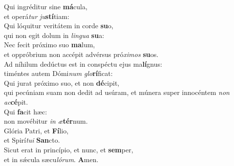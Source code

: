\evenverse Qui ingréditur sine \textbf{má}cula,~\*\\
\evenverse et operá\textit{tur} \textit{ju}\textbf{stí}tiam:\\
\oddverse Qui lóquitur veritátem in corde \textbf{su}o,~\*\\
\oddverse qui non egit dolum in \textit{lin}\textit{gua} \textbf{su}a:\\
\evenverse Nec fecit próximo suo \textbf{ma}lum,~\*\\
\evenverse et oppróbrium non accépit advérsus pró\textit{xi}\textit{mos} \textbf{su}os.\\
\oddverse Ad níhilum dedúctus est in conspéctu ejus ma\textbf{lí}gnus:~\*\\
\oddverse timéntes autem Dómi\textit{num} \textit{glo}\textbf{rí}ficat:\\
\evenverse Qui jurat próximo suo, et non \textbf{dé}cipit,~\*\\
\evenverse qui pecúniam suam non dedit ad usúram, et múnera super innocéntem \textit{non} \textit{ac}\textbf{cé}pit.\\
\oddverse Qui \textbf{fa}cit hæc:~\*\\
\oddverse non movébitur \textit{in} \textit{æ}\textbf{tér}num.\\
\evenverse Glória Patri, et \textbf{Fí}lio,~\*\\
\evenverse et Spirí\textit{tu}\textit{i} \textbf{San}cto.\\
\oddverse Sicut erat in princípio, et nunc, et \textbf{sem}per,~\*\\
\oddverse et in sǽcula sæcu\textit{ló}\textit{rum}. \textbf{A}men.\\

